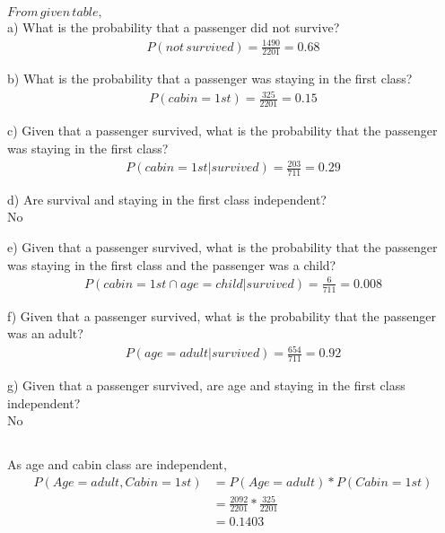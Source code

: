 \documentclass{exam}
\begin{document}
\newpage

\subsection{}
$From\, given\, table,$ \\ 

a) What is the probability that a passenger did not survive?
\begin{align}
P(not\, survived) = \frac{1490}{2201} = 0.68
\end{align} 

b) What is the probability that a passenger was staying in the first class?
\begin{align}
P(cabin=1st) = \frac{325}{2201} = 0.15
\end{align}

c) Given that a passenger survived, what is the probability that the passenger was staying in the first class?
\begin{align}
P(cabin=1st | survived) = \frac{203}{711} = 0.29
\end{align}

d) Are survival and staying in the first class independent? \\
No

e) Given that a passenger survived, what is the probability that the passenger was staying in the first class and the passenger was a child?
\begin{align}
P(cabin=1st \cap age=child | survived) = \frac{6}{711} = 0.008
\end{align}

f) Given that a passenger survived, what is the probability that the passenger was an adult?
\begin{align}
P(age = adult| survived) = \frac{654}{711} = 0.92
\end{align}

g) Given that a passenger survived, are age and staying in the first class independent? \\
No

\newpage
\subsection{}

As age and cabin class are independent,
\begin{align}
P(Age=adult, Cabin=1st) &= P(Age=adult) * P(Cabin=1st) \\
&= \frac{2092}{2201} *  \frac{325}{2201} \\
&= 0.1403 
\end{align}
\end{document}

